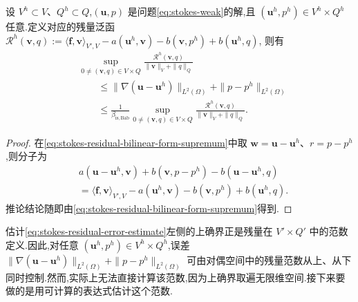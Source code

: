 \begin{corollary}[残量误差估计]\label{cor:stokes-residual-error-estimate}
设 $V^h\subset V$、$Q^h\subset Q$,$(\bm{u},p)$ 是问题\cref{eq:stokes-weak}的解,且 $(\bm{u}^h,p^h)\in V^h\times Q^h$ 任意.定义对应的残量泛函
$\mathcal{R}^h(\bm{v},q):=
\langle\bm{f},\bm{v}\rangle_{V',V}
-a(\bm{u}^h,\bm{v})-b(\bm{v},p^h)+b(\bm{u}^h,q)$,
则有
\begin{equation}\label{eq:stokes-residual-error-estimate}
\begin{aligned}
 &\sup_{0\ne(\bm{v},q)\in V\times Q}
 \frac{\mathcal{R}^h(\bm{v},q)}
      {\|\bm{v}\|_V+\|q\|_Q}\\
 &\qquad\leq\|\nabla(\bm{u}-\bm{u}^h)\|_{L^2(\Omega)}
       +\|p-p^h\|_{L^2(\Omega)}\\
 &\qquad\leq\frac1{\beta_{\mathrm{is,Bab}}}
  \sup_{0\ne(\bm{v},q)\in V\times Q}
 \frac{\mathcal{R}^h(\bm{v},q)}
      {\|\bm{v}\|_V+\|q\|_Q}.
\end{aligned}
\end{equation}
\end{corollary}
\begin{proof}
在\cref{eq:stokes-residual-bilinear-form-supremum}中取 $\bm{w}=\bm{u}-\bm{u}^h$、$r=p-p^h$,则分子为
\begin{equation}\label{eq:stokes-residual-error-identity}
\begin{aligned}
  &a(\bm{u}-\bm{u}^h,\bm{v})
       +b(\bm{v},p-p^h)-b(\bm{u}-\bm{u}^h,q)\\
  &=\langle\bm{f},\bm{v}\rangle_{V',V}
       -a(\bm{u}^h,\bm{v})-b(\bm{v},p^h)+b(\bm{u}^h,q).
\end{aligned}
\end{equation}
推论结论随即由\cref{eq:stokes-residual-bilinear-form-supremum}得到.
\end{proof}

\begin{note}\label{note:stokes-residual-error-estimate}
估计\cref{eq:stokes-residual-error-estimate}左侧的上确界正是残量在 $V'\times Q'$ 中的范数定义.因此,对任意 $(\bm{u}^h,p^h)\in V^h\times Q^h$,误差 $\|\nabla(\bm{u}-\bm{u}^h)\|_{L^2(\Omega)}+\|p-p^h\|_{L^2(\Omega)}$ 可由对偶空间中的残量范数从上、从下同时控制.然而,实际上无法直接计算该范数,因为上确界取遍无限维空间.接下来要做的是用可计算的表达式估计这个范数.
\end{note}

